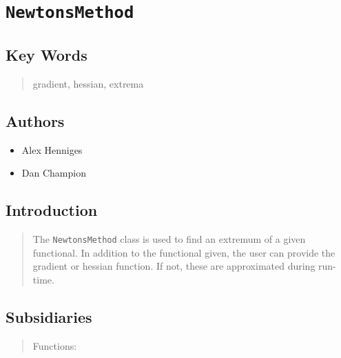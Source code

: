                       


\section*{\texttt{NewtonsMethod}}

\label{f0}

\subsection*{Key Words}

\begin{quotation}
gradient, hessian, extrema
\end{quotation}

\subsection*{Authors}

\begin{itemize}
\item Alex Henniges

\item Dan Champion
\end{itemize}

\subsection*{Introduction}

\begin{quotation}
The \texttt{NewtonsMethod} class is used to find an extremum of a given
functional. In addition to the functional given, the user can provide the
gradient or hessian function. If not, these are approximated during run-time.
\end{quotation}

\subsection*{Subsidiaries}

\begin{quotation}
Functions:
\end{quotation}

